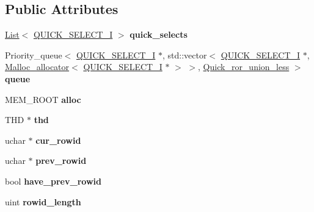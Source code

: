\subsection*{Public Attributes}
\begin{DoxyCompactItemize}
\item 
\mbox{\label{classQUICK__ROR__UNION__SELECT_aabaa03aad8805354466fb214d0dcde6e}} 
\mbox{\hyperlink{classList}{List}}$<$ \mbox{\hyperlink{classQUICK__SELECT__I}{Q\+U\+I\+C\+K\+\_\+\+S\+E\+L\+E\+C\+T\+\_\+I}} $>$ {\bfseries quick\+\_\+selects}
\item 
\mbox{\label{classQUICK__ROR__UNION__SELECT_aa18972a2f82edf4be925fdbb5e18e940}} 
Priority\+\_\+queue$<$ \mbox{\hyperlink{classQUICK__SELECT__I}{Q\+U\+I\+C\+K\+\_\+\+S\+E\+L\+E\+C\+T\+\_\+I}} $\ast$, std\+::vector$<$ \mbox{\hyperlink{classQUICK__SELECT__I}{Q\+U\+I\+C\+K\+\_\+\+S\+E\+L\+E\+C\+T\+\_\+I}} $\ast$, \mbox{\hyperlink{classMalloc__allocator}{Malloc\+\_\+allocator}}$<$ \mbox{\hyperlink{classQUICK__SELECT__I}{Q\+U\+I\+C\+K\+\_\+\+S\+E\+L\+E\+C\+T\+\_\+I}} $\ast$ $>$ $>$, \mbox{\hyperlink{structQuick__ror__union__less}{Quick\+\_\+ror\+\_\+union\+\_\+less}} $>$ {\bfseries queue}
\item 
\mbox{\label{classQUICK__ROR__UNION__SELECT_a0fa200fd5f651d25387b45e64de3bf52}} 
M\+E\+M\+\_\+\+R\+O\+OT {\bfseries alloc}
\item 
\mbox{\label{classQUICK__ROR__UNION__SELECT_ab06e47f4351181761f6f5ea2a8a57242}} 
T\+HD $\ast$ {\bfseries thd}
\item 
\mbox{\label{classQUICK__ROR__UNION__SELECT_a61ec557a6bbcf94aaafcf355993b0e6d}} 
uchar $\ast$ {\bfseries cur\+\_\+rowid}
\item 
\mbox{\label{classQUICK__ROR__UNION__SELECT_a1891a76ea092c4e6ce9ad6fc017f1146}} 
uchar $\ast$ {\bfseries prev\+\_\+rowid}
\item 
\mbox{\label{classQUICK__ROR__UNION__SELECT_a6b29b1b46012119f801216fcab8e33e2}} 
bool {\bfseries have\+\_\+prev\+\_\+rowid}
\item 
\mbox{\label{classQUICK__ROR__UNION__SELECT_afbc1d0cbc5db41603280b1c4fc3143bf}} 
uint {\bfseries rowid\+\_\+length}
\end{DoxyCompactItemize}
